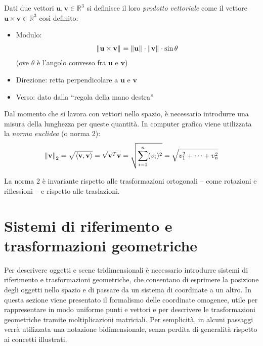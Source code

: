 \begin{definizione}
    Dati due vettori $\mathbf{u}, \mathbf{v} \in \mathbb{R}^3$ si definisce il loro \emph{prodotto vettoriale} come il vettore $\mathbf{u} \times \mathbf{v} \in \mathbb{R}^3$ così definito:
    \begin{itemize}
        \item Modulo:
        \[
            \norm{\mathbf{u} \times \mathbf{v}} = \norm{\mathbf{u}} \cdot \norm{\mathbf{v}} \cdot \sin{\theta}
        \]
        (ove $\theta$ è l'angolo convesso fra $\mathbf{u}$ e $\mathbf{v}$)
        \item Direzione: retta perpendicolare a $\mathbf{u}$ e $\mathbf{v}$
        \item Verso: dato dalla “regola della mano destra”
    \end{itemize}
\end{definizione}

Dal momento che si lavora con vettori nello spazio, è necessario introdurre una misura della lunghezza per queste quantità. In computer grafica viene utilizzata la \emph{norma euclidea} (o norma 2):
\[
    \norm[2]{\mathbf{v}} = \sqrt{\langle \mathbf{v}, \mathbf{v} \rangle} = \sqrt{\mathbf{v}^T \mathbf{v}} = \sqrt{\sum_{i=1}^{n} (v_i)^2} = \sqrt{v_1^2 + \cdots + v_n^2}
\]

\begin{osservazione}
    La norma 2 è invariante rispetto alle trasformazioni ortogonali -- come rotazioni e riflessioni -- e rispetto alle traslazioni.
\end{osservazione}

%
%
\section{Sistemi di riferimento e trasformazioni geometriche}
Per descrivere oggetti e scene tridimensionali è necessario introdurre sistemi di riferimento e trasformazioni geometriche, che consentano di esprimere la posizione degli oggetti nello spazio e di passare da un sistema di coordinate a un altro.
In questa sezione viene presentato il formalismo delle coordinate omogenee, utile per rappresentare in modo uniforme punti e vettori e per descrivere le trasformazioni geometriche tramite moltiplicazioni matriciali.
Per semplicità, in alcuni passaggi verrà utilizzata una notazione bidimensionale, senza perdita di generalità rispetto ai concetti illustrati.

